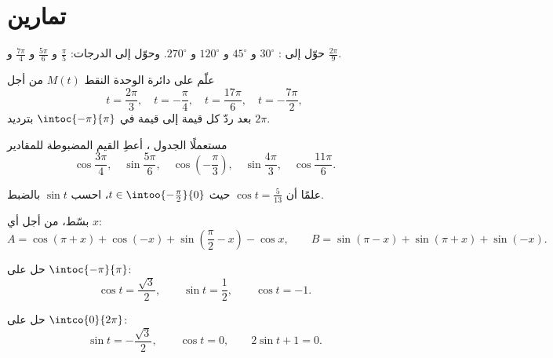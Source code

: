\section{تمارين}

\begin{exercise}[$\star$]\label{exo:g11:trigo:1}
حوّل إلى : $30^\circ$ و $45^\circ$ و $120^\circ$ و $270^\circ$.
وحوّل إلى الدرجات: $\frac{\pi}{5}$ و $\frac{5\pi}{6}$ و $\frac{7\pi}{4}$
و $\frac{2\pi}{9}$.
\end{exercise}

\begin{exercise}[$\star$]\label{exo:g11:trigo:2}
علّم على دائرة الوحدة النقط $M(t)$ من أجل
\[
t = \frac{2\pi}{3},\quad
t = -\frac{\pi}{4},\quad
t = \frac{17\pi}{6},\quad
t = -\frac{7\pi}{2},
\]
بعد ردّ كل قيمة إلى قيمة في $\intoc{-\pi}{\pi}$ بترديد $2\pi$.
\end{exercise}

\begin{exercise}[$\star$]\label{exo:g11:trigo:3}
مستعملًا الجدول ، أعطِ القيم المضبوطة للمقادير
\[
\cos\frac{3\pi}{4}, \quad
\sin\frac{5\pi}{6}, \quad
\cos\left(-\frac{\pi}{3}\right), \quad
\sin\frac{4\pi}{3}, \quad
\cos\frac{11\pi}{6} .
\]
\end{exercise}

\begin{exercise}[$\star$]\label{exo:g11:trigo:4}
علمًا أن $\cos t = \frac{5}{13}$ حيث $t \in \intoo{-\frac\pi2}{0}$، احسب
$\sin t$ بالضبط.
\end{exercise}

\begin{exercise}[$\star\star$]\label{exo:g11:trigo:5}
بسّط، من أجل أي  $x$:
\[
A = \cos(\pi + x) + \cos(-x) + \sin\left(\frac\pi2 - x\right) - \cos x,
\qquad
B = \sin(\pi - x) + \sin(\pi + x) + \sin(-x) .
\]
\end{exercise}

\begin{exercise}[$\star\star$]\label{exo:g11:trigo:6}
حل على $\intoc{-\pi}{\pi}$:
\[
\cos t = \frac{\sqrt3}{2}, \qquad
\sin t = \frac12, \qquad
\cos t = -1 .
\]
\end{exercise}

\begin{exercise}[$\star\star$]\label{exo:g11:trigo:7}
حل على $\intco{0}{2\pi}$:
\[
\sin t = -\frac{\sqrt3}{2}, \qquad
\cos t = 0, \qquad
2\sin t + 1 = 0 .
\]
\end{exercise}

